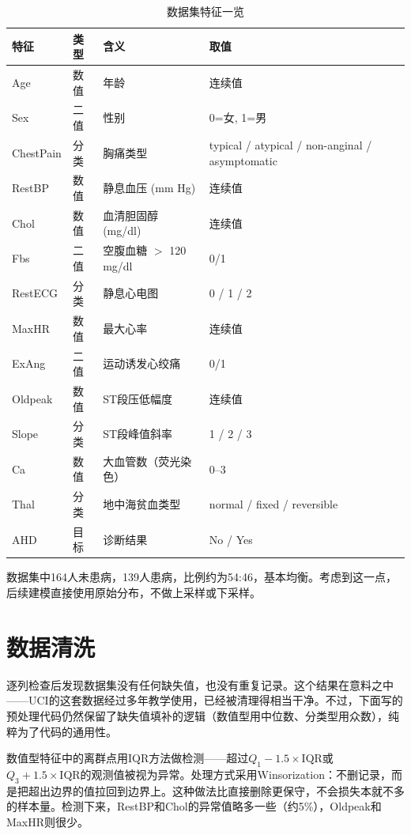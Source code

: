\documentclass[12pt,a4paper]{ctexart}
\begin{document}
\begin{table}[H]
\centering
\caption{数据集特征一览}
\label{tab:features}
\small
\begin{tabular}{llll}
\toprule
\textbf{特征} & \textbf{类型} & \textbf{含义} & \textbf{取值} \\
\midrule
Age      & 数值 & 年龄 & 连续值 \\
Sex      & 二值 & 性别 & 0=女, 1=男 \\
ChestPain & 分类 & 胸痛类型 & typical / atypical / non-anginal / asymptomatic \\
RestBP   & 数值 & 静息血压 (mm Hg) & 连续值 \\
Chol     & 数值 & 血清胆固醇 (mg/dl) & 连续值 \\
Fbs      & 二值 & 空腹血糖 $>$ 120 mg/dl & 0/1 \\
RestECG  & 分类 & 静息心电图 & 0 / 1 / 2 \\
MaxHR    & 数值 & 最大心率 & 连续值 \\
ExAng    & 二值 & 运动诱发心绞痛 & 0/1 \\
Oldpeak  & 数值 & ST段压低幅度 & 连续值 \\
Slope    & 分类 & ST段峰值斜率 & 1 / 2 / 3 \\
Ca       & 数值 & 大血管数（荧光染色） & 0--3 \\
Thal     & 分类 & 地中海贫血类型 & normal / fixed / reversible \\
AHD      & 目标 & 诊断结果 & No / Yes \\
\bottomrule
\end{tabular}
\end{table}

数据集中164人未患病，139人患病，比例约为54:46，基本均衡。考虑到这一点，后续建模直接使用原始分布，不做上采样或下采样。

\section{数据清洗}

逐列检查后发现数据集没有任何缺失值，也没有重复记录。这个结果在意料之中——UCI的这套数据经过多年教学使用，已经被清理得相当干净。不过，下面写的预处理代码仍然保留了缺失值填补的逻辑（数值型用中位数、分类型用众数），纯粹为了代码的通用性。

数值型特征中的离群点用IQR方法做检测——超过$Q_1 - 1.5 \times \text{IQR}$或$Q_3 + 1.5 \times \text{IQR}$的观测值被视为异常。处理方式采用Winsorization：不删记录，而是把超出边界的值拉回到边界上。这种做法比直接删除更保守，不会损失本就不多的样本量。检测下来，RestBP和Chol的异常值略多一些（约5\%），Oldpeak和MaxHR则很少。
\end{document}
